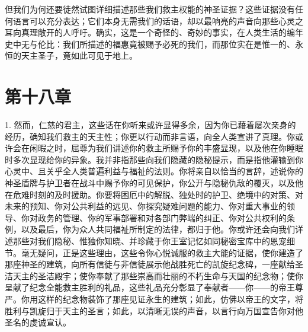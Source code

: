 但我们为何还要徒然试图详细描述那些我们救主权能的神圣证据？这些证据没有任何语言可以充分表达；它们本身无需我们的话语，却以最响亮的声音向那些心灵之耳向真理敞开的人呼吁。确实，这是一个奇怪的、奇妙的事实，在人类生活的编年史中无与伦比：我们所描述的福惠竟被赐予必死的我们，而那位实在是惟一的、永恒的天主圣子，竟如此可见于地上。\par


\section{第十八章}

1. 然而，仁慈的君主，这些话在你听来或许显得多余，因为你已藉着屡次亲身的经历，确知我们救主的天主性；你更以行动而非言语，向全人类宣讲了真理。你或许会在闲暇之时，屈尊为我们讲述你的救主所赐予你的丰盛显现，以及他在你睡眠时多次显现给你的异象。我并非指那些向我们隐藏的隐秘提示，而是指他灌输到你心灵中、且关乎全人类普遍利益与福祉的法则。你将亲自以恰当的言辞，述说你的神圣盾牌与护卫者在战斗中赐予你的可见保护，你公开与隐秘仇敌的覆灭，以及他在危难时刻的及时援助。你要将困厄中的解脱、独处时的护卫、绝境中的对策、对未来的预知、你对公共利益的远见、你探究疑难问题的能力、你对重大事业的领导、你对政务的管理、你的军事部署和对各部门弊端的纠正、你对公共权利的条例，以及最后，你为众人共同福祉所制定的法律，都归于他。你或许还会向我们详述那些对我们隐秘、惟独你知晓、并珍藏于你王室记忆如同秘密宝库中的恩宠细节。毫无疑问，正是这些理由，这些令你心悦诚服的救主大能的证据，使你建造了那座神圣的建筑，向所有信徒与非信徒展示他战胜死亡的凯旋纪念碑，一座献给圣洁天主的圣洁殿宇；使你奉献了那些崇高而壮丽的不朽生命与天国的纪念物；使你呈献了纪念全能救主胜利的礼品，这些礼品充分彰显了奉献者——你——的帝王尊严。你用这样的纪念物装饰了那座见证永生的建筑；如此，仿佛以帝王的文字，将胜利与凯旋归于天主的圣言；如此，以清晰无误的声音，以言行向万国宣告你对他圣名的虔诚宣认。\par

